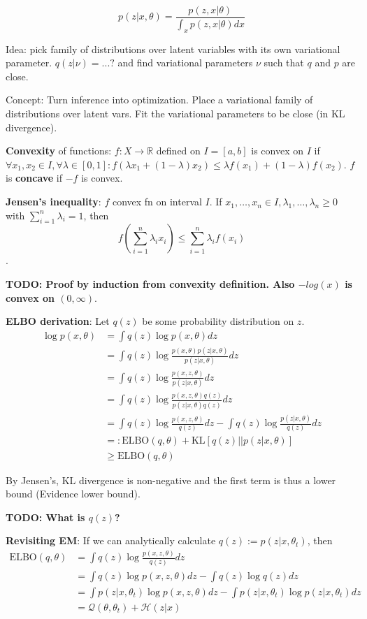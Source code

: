 \documentclass{article}
\newcommand{\mc}[1]{\mathcal{#1}}
\newcommand{\KL}[2]{\mathrm{KL}\left[#1||#2\right]}
\begin{document}
$$p(z|x, \theta) = \frac{p(z, x|\theta)}{\int_x p(z, x | \theta) dx}$$

Idea: pick family of distributions over latent variables with its own variational  parameter. $q(z|\nu) = ...?$  and find variational parameters $\nu$ such that $q$ and $p$ are close.

Concept: Turn inference into optimization. Place a variational family of distributions over latent vars. Fit the variational parameters to be close (in KL divergence).

\textbf{Convexity} of functions: $f: X \to \mathbb{R}$ defined on $I = [a, b]$ is convex on $I$ if $\forall x_1, x_2 \in I, \forall \lambda \in [0,1]: f(\lambda x_1 + (1-\lambda)x_2) \leq \lambda f(x_1) + (1-\lambda)f(x_2)$. $f$ is \textbf{concave} if $-f$ is convex.

\textbf{Jensen's inequality}: $f$ convex fn on interval $I$. If $x_1, \ldots, x_n \in I, \lambda_1, \ldots, \lambda_n \geq 0$ with $\sum_{i=1}^n \lambda_i = 1$, then $$f(\sum_{i=1}^n \lambda_i x_i) \leq \sum_{i=1}^n \lambda_i f(x_i)$$.

\textbf{TODO: Proof by induction from convexity definition. Also $-log(x)$ is convex on $(0, \infty)$}.

\textbf{ELBO derivation}: Let $q(z)$ be some probability distribution on $z$.
\begin{align*}
    \log p(x, \theta) &= \int q(z)\log p(x, \theta) dz\\
    &= \int q(z) \log \frac{p(x, \theta) p(z|x,\theta)}{p(z|x,\theta)} dz\\
    &= \int q(z) \log \frac{p(x, z, \theta)}{p(z|x,\theta)} dz\\
    &= \int q(z) \log \frac{p(x, z, \theta)q(z)}{p(z|x,\theta)q(z)} dz\\
    &= \int q(z) \log \frac{p(x, z, \theta)}{q(z)} dz - \int q(z) \log \frac{p(z|x, \theta)}{q(z)} dz\\
    &=: \mathrm{ELBO}(q, \theta) + \KL{q(z)}{p(z|x, \theta)}\\
    &\geq \mathrm{ELBO}(q, \theta)
\end{align*}

By Jensen's, KL divergence is non-negative and the first term is thus a lower bound (Evidence lower bound).

\textbf{TODO: What is $q(z)$?}

\textbf{Revisiting EM}: If we can analytically calculate $q(z):=p(z|x, \theta_t)$,
then
\begin{align*}
    \mathrm{ELBO}(q, \theta) &= \int q(z) \log\frac{p(x, z, \theta)}{q(z)}dz\\
    &= \int q(z) \log p(x, z, \theta) dz - \int q(z) \log q(z) dz\\
    &= \int p(z|x, \theta_t) \log p(x, z, \theta) dz - \int p(z|x, \theta_t) \log p(z|x, \theta_t) dz\\
    &= \mc{Q}(\theta, \theta_t) + \mc{H}(z|x)
\end{align*}
\end{document}
